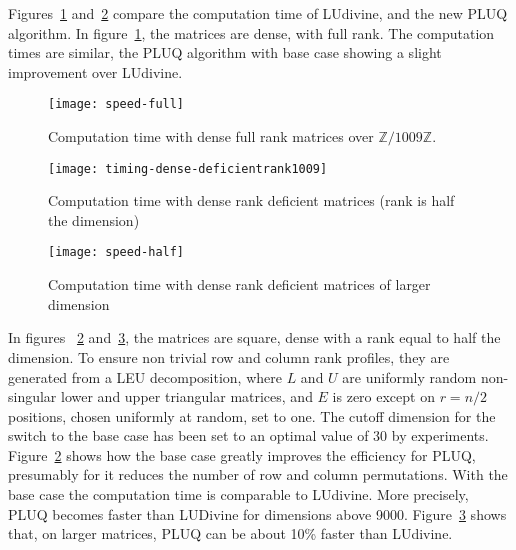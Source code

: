 \documentclass{article}
\newcommand{\Z}{\ensuremath{\mathbb{Z}}\xspace}
\begin{document}
Figures~\ref{fig:densefull} and~\ref{fig:densedeficient}  compare the computation time of
LUdivine, and the new PLUQ algorithm. In figure~\ref{fig:densefull}, the matrices are dense, with full rank. The
computation times are similar, the PLUQ algorithm with base case showing a
slight improvement over LUdivine. 
\begin{figure}[htb]
   \texttt{[image: speed-full]}
   \caption{Computation time with dense full rank matrices over $\Z/1009\Z$.}
   \label{fig:densefull}
\end{figure}
\begin{figure}[thb]
   \texttt{[image: timing-dense-deficientrank1009]}
   \caption{Computation time with dense rank deficient matrices (rank is half
     the dimension)}
   \label{fig:densedeficient}
\end{figure}
\begin{figure}[htb]
   \texttt{[image: speed-half]}
   \caption{Computation time with dense rank deficient matrices of larger dimension}
   \label{fig:densedeficientlarge}
\end{figure}
In figures ~\ref{fig:densedeficient} and~\ref{fig:densedeficientlarge}, the
matrices are square, dense with a rank equal to half the dimension. To ensure
non trivial row and column rank profiles, they are generated from a LEU
decomposition, where $L$ and $U$ are uniformly random non-singular lower and
upper triangular matrices, and $E$ is zero except on $r=n/2$ positions, chosen
uniformly at random, set to one.
The cutoff dimension for the switch to the base case has been set to an optimal
value of $30$ by experiments. Figure~\ref{fig:densedeficient}
shows how the base case greatly improves the efficiency for PLUQ, presumably for
it reduces the number of row and column permutations. With the base case the computation
time is comparable to LUdivine. More precisely, PLUQ becomes faster than
LUDivine for dimensions above 9000. Figure~\ref{fig:densedeficientlarge} shows
that, on larger matrices, PLUQ can be about 10\% faster than LUdivine.
\end{document}
